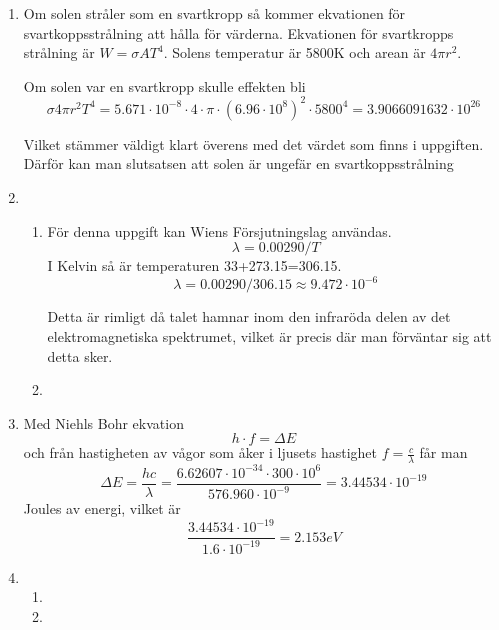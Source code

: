 \documentclass[a4paper,12pt]{article}
\begin{document}
\begin{enumerate}
      \item Om solen stråler som en svartkropp så kommer ekvationen för
            svartkoppsstrålning att hålla för värderna.
            Ekvationen för svartkropps strålning är $W=\sigma A T^4$.
            Solens temperatur är 5800K och arean är $4\pi r^2$.

            Om solen var en svartkropp skulle effekten bli
            $$\sigma 4\pi r^2T^4=5.671\cdot 10^{-8} \cdot 4 \cdot \pi \cdot (6.96\cdot 10^8)^2\cdot 5800^4=3.9066091632\cdot 10^{26}$$

            Vilket stämmer väldigt klart överens med det värdet som finns i uppgiften. Därför
            kan man slutsatsen att solen är ungefär en svartkoppsstrålning

      \item
            \begin{enumerate}
                  \item För denna uppgift kan Wiens Försjutningslag användas.
                        $$\lambda=0.00290/T$$
                        I Kelvin så är temperaturen 33+273.15=306.15.
                        $$\lambda=0.00290/306.15\approx 9.472\cdot 10^{-6}$$

                        Detta är rimligt då talet hamnar inom den infraröda delen
                        av det elektromagnetiska spektrumet, vilket är precis där
                        man förväntar sig att detta sker.

                  \item
            \end{enumerate}


      \item Med Niehls Bohr ekvation
            $$h\cdot f =\Delta E$$
            och från hastigheten av vågor som åker i ljusets hastighet
            $f=\frac{c}{\lambda}$ får man
            $$\Delta E=\frac{hc}{\lambda}=\frac{6.62607\cdot 10^{-34}\cdot 300\cdot 10^6}{576.960\cdot 10^{-9}}=3.44534\cdot 10^{-19}$$
            Joules av energi, vilket är
            $$\frac{3.44534\cdot 10^{-19}}{1.6\cdot 10^{-19}}=2.153 eV$$

      \item
            \begin{enumerate}
                  \item



                  \item



            \end{enumerate}
\end{enumerate}
\end{document}
